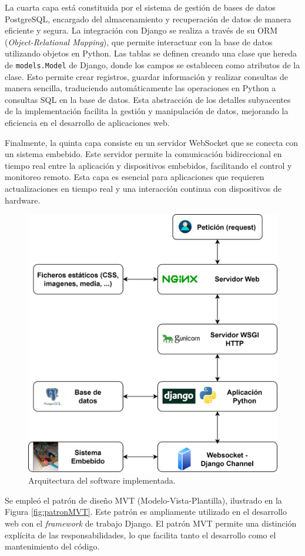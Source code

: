 La cuarta capa está constituida por el sistema de gestión de bases de datos PostgreSQL, encargado del almacenamiento y recuperación de datos de manera eficiente y segura. La integración con Django se realiza a través de su ORM (\textit{Object-Relational Mapping}), que permite interactuar con la base de datos utilizando objetos en Python. Las tablas se definen creando una clase que hereda de \texttt{models.Model} de Django, donde los campos se establecen como atributos de la clase. Esto permite crear registros, guardar información y realizar consultas de manera sencilla, traduciendo automáticamente las operaciones en Python a consultas SQL en la base de datos. Esta abstracción de los detalles subyacentes de la implementación facilita la gestión y manipulación de datos, mejorando la eficiencia en el desarrollo de aplicaciones web.




Finalmente, la quinta capa consiste en un servidor WebSocket que se conecta con un sistema embebido. Este servidor permite la comunicación bidireccional en tiempo real entre la aplicación y dispositivos embebidos, facilitando el control y monitoreo remoto. Esta capa es esencial para aplicaciones que requieren actualizaciones en tiempo real y una interacción continua con dispositivos de hardware.

\begin{figure}[H]
    \centering
    \includegraphics[width=0.7\linewidth]{Figuras/AplicacionWeb/arquitecturaSoft.png}
    \caption{Arquitectura del software implementada.}
    \label{fig:arquitecturaSoft}
\end{figure}
Se empleó el patrón de diseño MVT (Modelo-Vista-Plantilla), ilustrado en la Figura \ref{fig:patronMVT}. Este patrón es ampliamente utilizado en el desarrollo web con el \textit{framework} de trabajo Django. El patrón MVT permite una distinción explícita de las responsabilidades, lo que facilita tanto el desarrollo como el mantenimiento del código.


